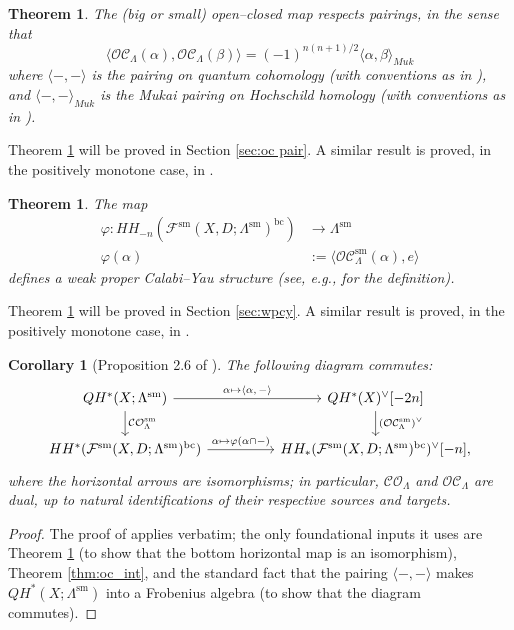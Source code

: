 \documentclass{article}
\newtheorem{thm}[lem]{Theorem}
\newtheorem{cor}[lem]{Corollary}
\def\fuk{\EuF}
\def\bc{\mathsf{bc}}
\def\cO{\mathcal{O}}
\def\cC{\mathcal{C}}
\def\fuk{\mathcal{F}}
\def\bc{{\operatorname{bc}}}
\def\sm{{\operatorname{sm}}}
\def\signn{{n(n+1)/2}}
\begin{document}
\begin{thm}\label{thm:mukai_int}
    The (big or small) open--closed map respects pairings, in the sense that
    $$\langle \cO\cC_\Lambda(\alpha),\cO\cC_\Lambda(\beta)\rangle = (-1)^\signn \langle \alpha, \beta \rangle_{Muk}$$
    where $\langle -,-\rangle$ is the pairing on quantum cohomology (with conventions as in \cite[Section 4.1]{relfukii}), and $\langle -,-\rangle_{Muk}$ is the Mukai pairing on Hochschild homology (with conventions as in \cite[Definition 5.19]{Sheridan_formulae}). 
\end{thm}

Theorem \ref{thm:mukai_int} will be proved in Section \ref{sec:oc pair}. A similar result is proved, in the positively monotone case, in \cite[Appendix B]{Ganatra2016}.

\begin{thm}\label{thm:wpcy}
    The map
    \begin{align*}
        \varphi: HH_{-n}(\fuk^\sm(X,D;\Lambda^\sm)^\bc) & \to \Lambda^\sm\\
        \varphi(\alpha) & := \langle \cO\cC_\Lambda^\sm(\alpha),e\rangle
    \end{align*}
    defines a \emph{weak proper Calabi--Yau structure} (see, e.g., \cite[Definition A.2]{Sheridan2013} for the definition). 
\end{thm}

Theorem \ref{thm:wpcy} will be proved in Section \ref{sec:wpcy}. A similar result is proved, in the positively monotone case, in \cite[Lemma 2.4]{Sheridan2013}.

\begin{cor}[Proposition 2.6 of \cite{Sheridan2013}] \label{cor:co_oc_dual}
    The following diagram commutes:
    $$\begin{tikzcd}
         QH^*(X;\Lambda^\sm) \ar[rr,"\alpha \mapsto \langle \alpha{,}\, -\rangle"] \ar[d,"\cC\cO_\Lambda^\sm"]   & &QH^*(X)^\vee[-2n] \ar[d,"(\cO\cC_\Lambda^\sm)^\vee"]  \\
        HH^*(\fuk^\sm(X,D;\Lambda^\sm)^\bc) \ar[rr,"\alpha \mapsto \varphi(\alpha \cap -)"] && HH_*(\fuk^\sm(X,D;\Lambda^\sm)^\bc)^\vee[-n],
     \end{tikzcd}
    $$
    where the horizontal arrows are isomorphisms; in particular, $\cC\cO_\Lambda$ and $\cO\cC_\Lambda$ are dual, up to natural identifications of their respective sources and targets.
\end{cor}
\begin{proof}
    The proof of \cite[Proposition 2.6]{Sheridan2013} applies verbatim; the only foundational inputs it uses are Theorem \ref{thm:wpcy} (to show that the bottom horizontal map is an isomorphism), Theorem \ref{thm:oc_int}, and the standard fact that the pairing $\langle -,-\rangle$ makes $QH^*(X;\Lambda^\sm)$ into a Frobenius algebra (to show that the diagram commutes).
\end{proof}
\end{document}
